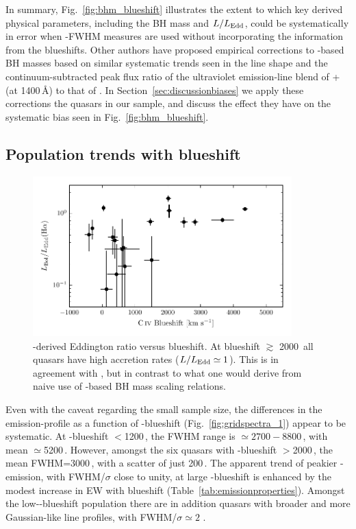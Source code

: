 In summary, Fig.~\ref{fig:bhm_blueshift} illustrates the extent to which key derived physical parameters, including the BH mass and $L/L_{\rm Edd}$, could be systematically in error when -FWHM measures are used without incorporating the information from the  blueshifts. 
Other authors have proposed empirical corrections to -based BH masses based on similar systematic trends seen in the  line shape \citep{denney12} and the continuum-subtracted peak flux ratio of the ultraviolet emission-line blend of + (at 1400\,\AA) to that of  \citep{runnoe13}.
In Section~\ref{sec:discussionbiases} we apply these corrections the quasars in our sample, and discuss the effect they have on the systematic bias seen in Fig.~\ref{fig:bhm_blueshift}. 

\subsection{Population trends with  blueshift}
\label{sec:hatrends}

\begin{figure}
	\includegraphics[width=10cm]{figures/chapter02/ha_edd_civ_bs.pdf}
    \caption{\hans-derived Eddington ratio versus  blueshift. At blueshift $\gtrsim$ 2000\kms\, all quasars have high accretion rates ($L/L_{\rm Edd} \simeq 1$). This is in agreement with \citet{kratzer15}, but in contrast to what one would derive from naive use of -based BH mass scaling relations.}
    \label{fig:ha_edd_civ_bs}
\end{figure}

Even with the caveat regarding the small sample size, the differences in the \ha emission-profile as a function of -blueshift (Fig.~\ref{fig:gridspectra_1}) appear to be systematic.
At -blueshift $<$1200\,\kms, the \ha FWHM range is $\simeq2700 - 8800$\,\kms, with mean $\simeq$5200\,\kms.
However, amongst the six quasars with -blueshift $>$2000\,\kms, the mean \ha FWHM=3000\,\kms, with a scatter of just 200\,\kms. 
The apparent trend of peakier \hans-emission, with FWHM/$\sigma$ close to unity, at large -blueshift is enhanced by the modest increase in \ha EW with blueshift (Table~\ref{tab:emissionproperties}). 
Amongst the low--blueshift population there are in addition quasars with broader and more Gaussian-like \ha line profiles, with FWHM/$\sigma \simeq 2$ . 

